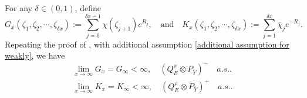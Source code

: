 \documentclass[]{article}
\makeatletter
\numberwithin{equation}{section}
\renewenvironment{proof}[1][\proofname]{%
	\par\pushQED{\qed}\normalfont%
	\topsep6\p@\@plus6\p@\relax
	\trivlist\item[\hskip\labelsep\bfseries#1\@addpunct{.}]%
	\ignorespaces
}{%
	\popQED\endtrivlist\@endpefalse
}
\theoremstyle{thmstyleone}%
\theoremstyle{thmstyletwo}%
\theoremstyle{thmstylethree}%
\theoremstyle{thmstylefour}%
\theoremstyle{thmstylefive}%
\theoremstyle{thmstylesix}%
\makeatother
\begin{document}
\begin{proof}[Proof of \Cref{lemma of weakly 1}]
		For any $\delta\in (0,1)$, define 
		\begin{equation*}
			G_x(\zeta_1,\zeta_2,\cdots,\zeta_{\delta x}):= 
			\sum_{j=0}^{\delta x-1} \chi(\zeta_{j+1}) e^{R_j}, \quad 
			\text{and}\quad  K_x(\zeta_1,\zeta_2,\cdots,\zeta_{\delta x})
			:= \sum_{j=1}^{\delta x} \overline{\chi}_j e^{-R_j}.
		\end{equation*}
		Repeating the proof of , with additional assumption \cref{additional assumption for weakly}, we have
		\begin{align*}
			\lim\limits_{x\rightarrow\infty}G_x = G_\infty<\infty,\quad (Q_E^{\rho}\otimes P_{\overline{Y}})^- \quad a.s..
			\nonumber\\
			\lim\limits_{x\rightarrow\infty}K_x = K_\infty<\infty,\quad (Q_E^{\rho}\otimes P_{\overline{Y}})^+ \quad a.s..
		\end{align*}
	

\end{proof}
\end{document}
